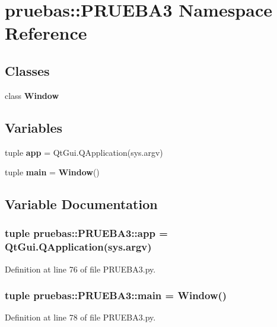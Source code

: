 \section{pruebas\-:\-:\-P\-R\-U\-E\-B\-A3 \-Namespace \-Reference}
\label{namespacepruebas_1_1_p_r_u_e_b_a3}
\subsection*{\-Classes}
\begin{DoxyCompactItemize}
\item 
class {\bf \-Window}
\end{DoxyCompactItemize}
\subsection*{\-Variables}
\begin{DoxyCompactItemize}
\item 
tuple {\bf app} = \-Qt\-Gui.\-Q\-Application(sys.\-argv)
\item 
tuple {\bf main} = {\bf \-Window}()
\end{DoxyCompactItemize}


\subsection{\-Variable \-Documentation}
\subsubsection[{app}]{\setlength{\rightskip}{0pt plus 5cm}tuple {\bf pruebas\-::\-P\-R\-U\-E\-B\-A3\-::app} = \-Qt\-Gui.\-Q\-Application(sys.\-argv)}\label{namespacepruebas_1_1_p_r_u_e_b_a3_ab3be756ea16955d8946d344aca6c9e32}


\-Definition at line 76 of file \-P\-R\-U\-E\-B\-A3.\-py.

\subsubsection[{main}]{\setlength{\rightskip}{0pt plus 5cm}tuple {\bf pruebas\-::\-P\-R\-U\-E\-B\-A3\-::main} = {\bf \-Window}()}\label{namespacepruebas_1_1_p_r_u_e_b_a3_ae811fab1b4d729dc7284157ff0e0d8fa}


\-Definition at line 78 of file \-P\-R\-U\-E\-B\-A3.\-py.

